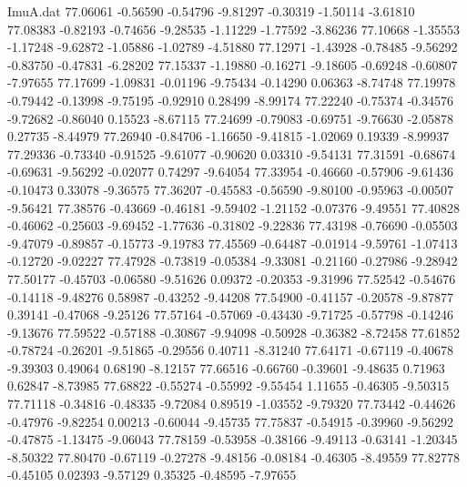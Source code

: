 \begin{filecontents}{ImuA.dat}
  77.06061   -0.56590   -0.54796   -9.81297   -0.30319   -1.50114   -3.61810
  77.08383   -0.82193   -0.74656   -9.28535   -1.11229   -1.77592   -3.86236
  77.10668   -1.35553   -1.17248   -9.62872   -1.05886   -1.02789   -4.51880
  77.12971   -1.43928   -0.78485   -9.56292   -0.83750   -0.47831   -6.28202
  77.15337   -1.19880   -0.16271   -9.18605   -0.69248   -0.60807   -7.97655
  77.17699   -1.09831   -0.01196   -9.75434   -0.14290    0.06363   -8.74748
  77.19978   -0.79442   -0.13998   -9.75195   -0.92910    0.28499   -8.99174
  77.22240   -0.75374   -0.34576   -9.72682   -0.86040    0.15523   -8.67115
  77.24699   -0.79083   -0.69751   -9.76630   -2.05878    0.27735   -8.44979
  77.26940   -0.84706   -1.16650   -9.41815   -1.02069    0.19339   -8.99937
  77.29336   -0.73340   -0.91525   -9.61077   -0.90620    0.03310   -9.54131
  77.31591   -0.68674   -0.69631   -9.56292   -0.02077    0.74297   -9.64054
  77.33954   -0.46660   -0.57906   -9.61436   -0.10473    0.33078   -9.36575
  77.36207   -0.45583   -0.56590   -9.80100   -0.95963   -0.00507   -9.56421
  77.38576   -0.43669   -0.46181   -9.59402   -1.21152   -0.07376   -9.49551
  77.40828   -0.46062   -0.25603   -9.69452   -1.77636   -0.31802   -9.22836
  77.43198   -0.76690   -0.05503   -9.47079   -0.89857   -0.15773   -9.19783
  77.45569   -0.64487   -0.01914   -9.59761   -1.07413   -0.12720   -9.02227
  77.47928   -0.73819   -0.05384   -9.33081   -0.21160   -0.27986   -9.28942
  77.50177   -0.45703   -0.06580   -9.51626    0.09372   -0.20353   -9.31996
  77.52542   -0.54676   -0.14118   -9.48276    0.58987   -0.43252   -9.44208
  77.54900   -0.41157   -0.20578   -9.87877    0.39141   -0.47068   -9.25126
  77.57164   -0.57069   -0.43430   -9.71725   -0.57798   -0.14246   -9.13676
  77.59522   -0.57188   -0.30867   -9.94098   -0.50928   -0.36382   -8.72458
  77.61852   -0.78724   -0.26201   -9.51865   -0.29556    0.40711   -8.31240
  77.64171   -0.67119   -0.40678   -9.39303    0.49064    0.68190   -8.12157
  77.66516   -0.66760   -0.39601   -9.48635    0.71963    0.62847   -8.73985
  77.68822   -0.55274   -0.55992   -9.55454    1.11655   -0.46305   -9.50315
  77.71118   -0.34816   -0.48335   -9.72084    0.89519   -1.03552   -9.79320
  77.73442   -0.44626   -0.47976   -9.82254    0.00213   -0.60044   -9.45735
  77.75837   -0.54915   -0.39960   -9.56292   -0.47875   -1.13475   -9.06043
  77.78159   -0.53958   -0.38166   -9.49113   -0.63141   -1.20345   -8.50322
  77.80470   -0.67119   -0.27278   -9.48156   -0.08184   -0.46305   -8.49559
  77.82778   -0.45105    0.02393   -9.57129    0.35325   -0.48595   -7.97655

\end{filecontents}
